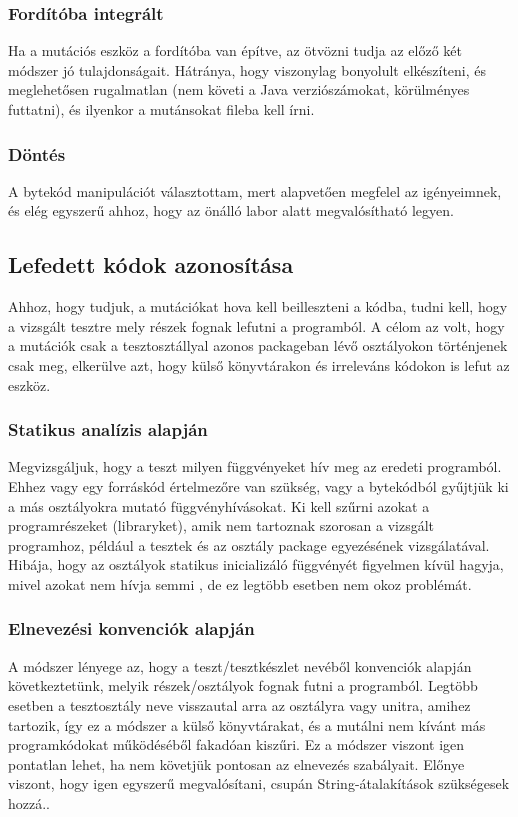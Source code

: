\subsubsection{Fordítóba integrált}
Ha a mutációs eszköz a fordítóba van építve, az ötvözni tudja az előző két módszer jó tulajdonságait. Hátránya, hogy viszonylag bonyolult elkészíteni, és meglehetősen rugalmatlan (nem követi a Java verziószámokat, körülményes futtatni), és ilyenkor a mutánsokat fileba kell írni.
\subsubsection{Döntés}
A bytekód manipulációt választottam, mert alapvetően megfelel az igényeimnek, és elég egyszerű ahhoz, hogy az önálló labor alatt megvalósítható legyen.
\subsection{Lefedett kódok azonosítása}
Ahhoz, hogy tudjuk, a mutációkat hova kell beilleszteni a kódba, tudni kell, hogy a vizsgált tesztre mely részek fognak lefutni a programból. A célom az volt, hogy a mutációk csak a tesztosztállyal azonos packageban lévő osztályokon történjenek csak meg, elkerülve azt, hogy külső könyvtárakon és irreleváns kódokon is lefut az eszköz.
\subsubsection{Statikus analízis alapján}
Megvizsgáljuk, hogy a teszt milyen függvényeket hív meg az eredeti programból. Ehhez vagy egy forráskód értelmezőre van szükség, vagy a bytekódból gyűjtjük ki a más osztályokra mutató függvényhívásokat. Ki kell szűrni azokat a programrészeket (libraryket), amik nem tartoznak szorosan a vizsgált programhoz, például a tesztek és az osztály package egyezésének vizsgálatával. Hibája, hogy az osztályok statikus inicializáló függvényét figyelmen kívül hagyja, mivel azokat nem hívja semmi \cite{so_you_want_to}, de ez legtöbb esetben nem okoz problémát.
\subsubsection{Elnevezési konvenciók alapján}
A módszer lényege az, hogy a teszt/tesztkészlet nevéből konvenciók alapján következtetünk, melyik részek/osztályok fognak futni a programból. Legtöbb esetben a tesztosztály neve visszautal arra az osztályra vagy unitra, amihez tartozik, így ez a módszer a külső könyvtárakat, és a mutálni nem kívánt más programkódokat működéséből fakadóan kiszűri. Ez a módszer viszont igen pontatlan lehet, ha nem követjük pontosan az elnevezés szabályait. Előnye viszont, hogy igen egyszerű megvalósítani, csupán String-átalakítások szükségesek hozzá..
